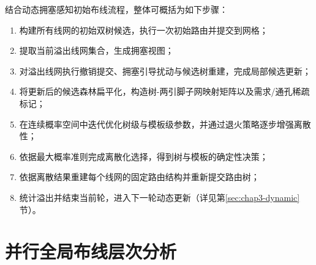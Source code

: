 结合动态拥塞感知初始布线流程，整体可概括为如下步骤：
\begin{enumerate}
    \item 构建所有线网的初始双树候选，执行一次初始路由并提交到网格；
    \item 提取当前溢出线网集合，生成拥塞视图；
    \item 对溢出线网执行撤销提交、拥塞引导扰动与候选树重建，完成局部候选更新；
    \item 将更新后的候选森林扁平化，构造树-两引脚子网映射矩阵以及需求/通孔稀疏标记；
    \item 在连续概率空间中迭代优化树级与模板级参数，并通过退火策略逐步增强离散性；
    \item 依据最大概率准则完成离散化选择，得到树与模板的确定性决策；
    \item 依据离散结果重建每个线网的固定路由结构并重新提交路由树；
    \item 统计溢出并结束当前轮，进入下一轮动态更新（详见第\ref{sec:chap3-dynamic}节）。
\end{enumerate}


\section{并行全局布线层次分析}
\label{sec:chap3-parallel}



